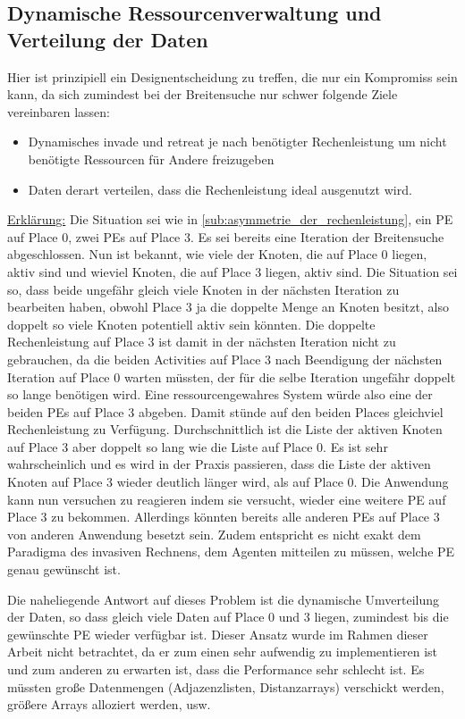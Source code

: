 \subsection{Dynamische Ressourcenverwaltung und Verteilung der Daten} %
\label{sub:dynamische_ressourcenverwaltung}
Hier ist prinzipiell ein Designentscheidung zu treffen, die nur ein Kompromiss sein kann, da sich zumindest bei der Breitensuche nur schwer folgende Ziele vereinbaren lassen:
\begin{itemize}
	\item Dynamisches invade und retreat je nach benötigter Rechenleistung um nicht benötigte Ressourcen für Andere freizugeben
	\item Daten derart verteilen, dass die Rechenleistung ideal ausgenutzt wird.
\end{itemize}
\underline{Erklärung:} Die Situation sei wie in \ref{sub:asymmetrie_der_rechenleistung}, ein PE auf Place 0, zwei PEs auf Place 3. Es sei bereits eine Iteration der Breitensuche abgeschlossen. Nun ist bekannt, wie viele der Knoten, die auf Place 0 liegen, aktiv sind und wieviel Knoten, die auf Place 3 liegen, aktiv sind. Die Situation sei so, dass beide ungefähr gleich viele Knoten in der nächsten Iteration zu bearbeiten haben, obwohl Place 3 ja die doppelte Menge an Knoten besitzt, also doppelt so viele Knoten potentiell aktiv sein könnten. Die doppelte Rechenleistung auf Place 3 ist damit in der nächsten Iteration nicht zu gebrauchen, da die beiden Activities auf Place 3 nach Beendigung der nächsten Iteration auf Place 0 warten müssten, der für die selbe Iteration ungefähr doppelt so lange benötigen wird. Eine ressourcengewahres System würde also eine der beiden PEs auf Place 3 abgeben. Damit stünde auf den beiden Places gleichviel Rechenleistung zu Verfügung. Durchschnittlich ist die Liste der aktiven Knoten auf Place 3 aber doppelt so lang wie die Liste auf Place 0. Es ist sehr wahrscheinlich und es wird in der Praxis passieren, dass die Liste der aktiven Knoten auf Place 3 wieder deutlich länger wird, als auf Place 0. Die Anwendung kann nun versuchen zu reagieren indem sie versucht, wieder eine weitere PE auf Place 3 zu bekommen. Allerdings könnten bereits alle anderen PEs auf Place 3 von anderen Anwendung besetzt sein. Zudem entspricht es nicht exakt dem Paradigma des invasiven Rechnens, dem Agenten mitteilen zu müssen, welche PE genau gewünscht ist.

Die naheliegende Antwort auf dieses Problem ist die dynamische Umverteilung der Daten, so dass gleich viele Daten auf Place 0 und 3 liegen, zumindest bis die gewünschte PE wieder verfügbar ist. Dieser Ansatz wurde im Rahmen dieser Arbeit nicht betrachtet, da er zum einen sehr aufwendig zu implementieren ist und zum anderen zu erwarten ist, dass die Performance sehr schlecht ist. Es müssten große Datenmengen (Adjazenzlisten, Distanzarrays) verschickt werden, größere Arrays alloziert werden, usw.

